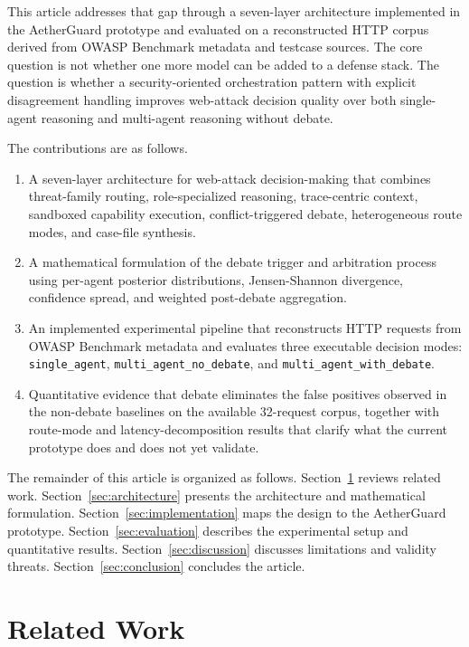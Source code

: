 \documentclass{ieeeaccess}
\newcommand{\sys}{AetherGuard}
\begin{document}
This article addresses that gap through a seven-layer architecture implemented in the \sys{} prototype and evaluated on a reconstructed HTTP corpus derived from OWASP Benchmark metadata and testcase sources. The core question is not whether one more model can be added to a defense stack. The question is whether a security-oriented orchestration pattern with explicit disagreement handling improves web-attack decision quality over both single-agent reasoning and multi-agent reasoning without debate.

The contributions are as follows.
\begin{enumerate}
\item A seven-layer architecture for web-attack decision-making that combines threat-family routing, role-specialized reasoning, trace-centric context, sandboxed capability execution, conflict-triggered debate, heterogeneous route modes, and case-file synthesis.
\item A mathematical formulation of the debate trigger and arbitration process using per-agent posterior distributions, Jensen-Shannon divergence, confidence spread, and weighted post-debate aggregation.
\item An implemented experimental pipeline that reconstructs HTTP requests from OWASP Benchmark metadata and evaluates three executable decision modes: \texttt{single\_agent}, \texttt{multi\_agent\_no\_debate}, and \texttt{multi\_agent\_with\_debate}.
\item Quantitative evidence that debate eliminates the false positives observed in the non-debate baselines on the available 32-request corpus, together with route-mode and latency-decomposition results that clarify what the current prototype does and does not yet validate.
\end{enumerate}

The remainder of this article is organized as follows. Section~\ref{sec:related} reviews related work. Section~\ref{sec:architecture} presents the architecture and mathematical formulation. Section~\ref{sec:implementation} maps the design to the \sys{} prototype. Section~\ref{sec:evaluation} describes the experimental setup and quantitative results. Section~\ref{sec:discussion} discusses limitations and validity threats. Section~\ref{sec:conclusion} concludes the article.

\section{Related Work}
\label{sec:related}
\end{document}
